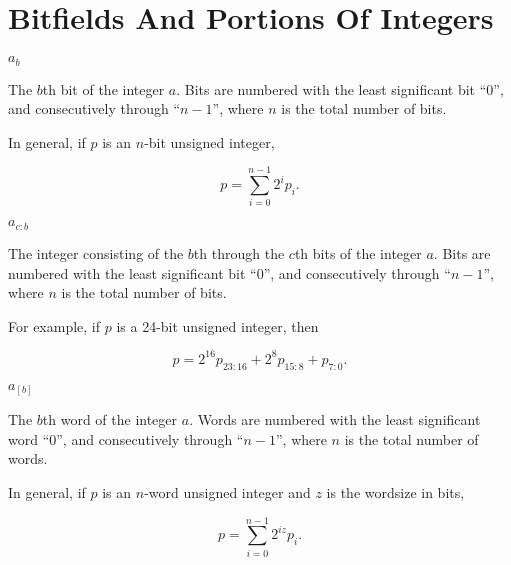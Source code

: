 
\section*{Bitfields And Portions Of Integers}

\begin{vworkmathtermglossaryenum}
\item \mbox{\boldmath $a_{b}$}

      The $b$th bit of the integer $a$.  Bits are numbered with the
      least significant bit ``0'', and consecutively through 
      ``$n-1$'', where $n$ is the total number of bits.

      In general, if $p$ is an $n$-bit unsigned integer,

      \begin{equation}
      \nonumber p = \sum_{i=0}^{n-1} 2^i p_i .
      \end{equation}

\item \mbox{\boldmath $a_{c:b}$}

      The integer consisting of the $b$th through the
      $c$th bits of the integer $a$.  Bits are numbered with the
      least significant bit ``0'', and consecutively through 
      ``$n-1$'', where $n$ is the total number of bits.

      For example, if $p$ is a 24-bit unsigned integer, then

      \begin{equation}
      \nonumber p = 2^{16}p_{23:16} + 2^{8}p_{15:8} + p_{7:0} .
      \end{equation}

\item \mbox{\boldmath $a_{[b]}$}

      The $b$th word of the integer $a$.  Words are numbered 
      with the
      least significant word ``0'', and consecutively through 
      ``$n-1$'', where $n$ is the total number of words.

      In general, if $p$ is an $n$-word unsigned integer 
      and $z$ is the wordsize in bits,

      \begin{equation}
      \nonumber p = \sum_{i=0}^{n-1} 2^{iz} p_i .
      \end{equation}


\end{vworkmathtermglossaryenum}
